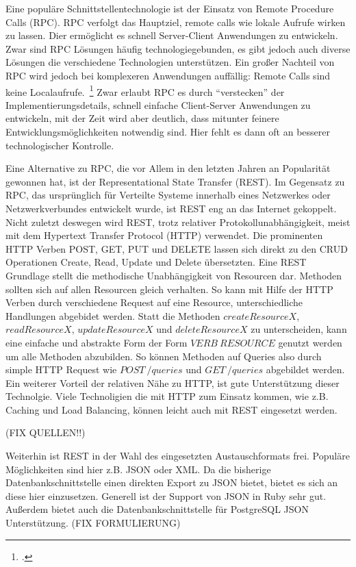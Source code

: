 Eine populäre Schnittstellentechnologie ist der Einsatz von Remote Procedure Calls (RPC). RPC verfolgt das Hauptziel, remote calls wie lokale Aufrufe wirken zu lassen. Dier ermöglicht es schnell Server-Client Anwendungen zu entwickeln. Zwar sind RPC Lösungen häufig technologiegebunden, es gibt jedoch auch diverse Lösungen die verschiedene Technologien unterstützen. Ein großer Nachteil von RPC wird jedoch bei komplexeren Anwendungen auffällig: Remote Calls sind keine Localaufrufe.~\footcite[][Seite 47]{newman2015building} Zwar erlaubt RPC es durch ``verstecken'' der Implementierungsdetails, schnell einfache Client-Server Anwendungen zu entwickeln, mit der Zeit wird aber deutlich, dass mitunter feinere Entwicklungsmöglichkeiten notwendig sind. Hier fehlt es dann oft an besserer technologischer Kontrolle.

Eine Alternative zu RPC, die vor Allem in den letzten Jahren an Popularität gewonnen hat, ist der Representational State Transfer (REST). Im Gegensatz zu RPC, das ursprünglich für Verteilte Systeme innerhalb eines Netzwerkes oder Netzwerkverbundes entwickelt wurde, ist REST eng an das Internet gekoppelt. Nicht zuletzt deswegen wird REST, trotz relativer Protokollunabhängigkeit, meist mit dem Hypertext Transfer Protocol (HTTP) verwendet. Die prominenten HTTP Verben POST, GET, PUT und DELETE lassen sich direkt zu den CRUD Operationen Create, Read, Update und Delete übersetzten. Eine REST Grundlage stellt die methodische Unabhängigkeit von Resourcen dar. Methoden sollten sich auf allen Resourcen gleich verhalten. So kann mit Hilfe der HTTP Verben durch verschiedene Request auf eine Resource, unterschiedliche Handlungen abgebidet werden. Statt die Methoden $createResourceX$, $readResourceX$, $updateResourceX$ und $deleteResourceX$ zu unterscheiden, kann eine einfache und abstrakte Form der Form $VERB\ RESOURCE$ genutzt werden um alle Methoden abzubilden. So können Methoden auf Queries also durch simple HTTP Request wie $POST\ /queries$ und $GET\ /queries$ abgebildet werden. Ein weiterer Vorteil der relativen Nähe zu HTTP, ist gute Unterstützung dieser Technolgie. Viele Technoligien die mit HTTP zum Einsatz kommen, wie z.B. Caching und Load Balancing, können leicht auch mit REST eingesetzt werden.

(FIX QUELLEN!!)

Weiterhin ist REST in der Wahl des eingesetzten Austauschformats frei. Populäre Möglichkeiten sind hier z.B. JSON oder XML. Da die bisherige Datenbankschnittstelle einen direkten Export zu JSON bietet, bietet es sich an diese hier einzusetzen. Generell ist der Support von JSON in Ruby sehr gut. Außerdem bietet auch die Datenbankschnittstelle für PostgreSQL JSON Unterstützung. (FIX FORMULIERUNG)

